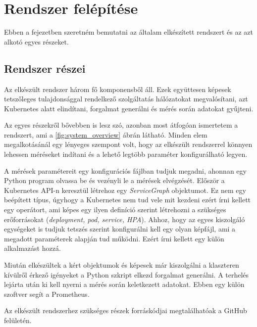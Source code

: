 \chapter{Rendszer felépítése}
\label{sec:system}
Ebben a fejezetben szeretném bemutatni az általam elkészített rendszert és az azt alkotó egyes részeket.


\section{Rendszer részei}
Az elkészült rendszer három fő komponensből áll. Ezek együttesen képesek tetszőleges tulajdonsággal rendelkező szolgáltatás hálózatokat megvalósítani, azt Kubernetes alatt elindítani, forgalmat generálni és mérés során adatokat gyűjteni. 

Az egyes részekről bővebben is lesz szó, azonban most átfogóan ismertetem a rendszert, ami a \ref{fig:system_overview} ábrán látható. Minden elem megalkotásánál egy lényeges szempont volt, hogy az elkészült rendszerrel könnyen lehessen méréseket indítani és a lehető legtöbb paraméter konfigurálható legyen.

A mérések paramétereit egy konfigurációs fájlban tudjuk megadni, ahonnan egy Python program olvassa be és vezényli le a mérések elvégzését. Először a Kubernetes API-n keresztül létrehoz egy \textit{ServiceGraph} objektumot. Ez nem egy beépített típus, úgyhogy a Kubernetes nem tud vele mit kezdeni ezért írni kellett egy operátort, ami képes egy ilyen definíció szerint létrehozni a szükséges erőforrásokat (\textit{deployment, pod, service, HPA}). Ahhoz, hogy az egyes kiszolgáló egységeket is tudjuk tetszés szerint konfigurálni kell egy olyan képfájl, ami a megadott paraméterek alapján tud működni. Ezért írni kellett egy külön alkalmazást hozzá.

Miután elkészültek a kért objektumok és képesek már kiszolgálni a klaszteren kívülről érkező igényeket a Python szkript elkezd forgalmat generálni. A terhelés lejárta után ki kell nyerni a mérés során keletkezett adatokat. Ebben egy külön szoftver segít a Prometheus\citep{Prometheus}. 

Az elkészült rendszerhez szükséges részek forráskódjai megtalálhatóak a GitHub felületén\citep{gitRepo}. 

